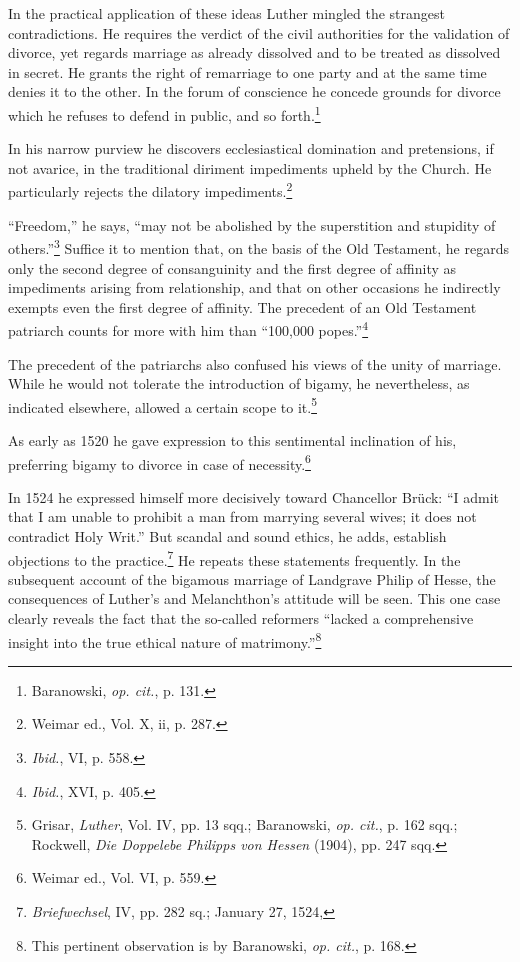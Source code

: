 In the practical application of these ideas Luther mingled the
strangest contradictions. He requires the verdict of the civil authorities
for the validation of divorce, yet regards marriage as already dissolved
and to be treated as dissolved in secret. He grants the right of
remarriage to one party and at the same time denies it to the other.
In the forum of conscience he concede grounds for divorce which he
refuses to defend in public, and so forth.\footnote{Baranowski, \textit{op. cit.}, p. 131.}

In his narrow purview he discovers ecclesiastical domination and
pretensions, if not avarice, in the traditional diriment impediments
upheld by the Church. He particularly rejects the dilatory impediments.\footnote{Weimar ed., Vol. X, ii, p. 287.}

“Freedom,” he says, “may not be abolished by
the superstition and stupidity of others.”\footnote{\textit{Ibid.}, VI, p. 558.}
 Suffice it to mention that,
on the basis of the Old Testament, he regards only the second degree
of consanguinity and the first degree of affinity as impediments arising
from relationship, and that on other occasions he indirectly exempts even
the first degree of affinity. The precedent of an Old Testament patriarch
counts for more with him than “100,000 popes.”\footnote{\textit{Ibid.}, XVI, p. 405.}

The precedent of the patriarchs also confused his views of the
unity of marriage. While he would not tolerate the introduction of
bigamy, he nevertheless, as indicated elsewhere, allowed a certain scope
to it.\footnote
{Grisar, \textit{Luther}, Vol. IV, pp. 13 sqq.; Baranowski, \textit{op. cit.}, p. 162 sqq.; Rockwell, \textit{Die
Doppelebe Philipps von Hessen} (1904), pp. 247 sqq.}

As early as 1520 he gave expression to this sentimental inclination
of his, preferring bigamy to divorce in case of necessity.\footnote{Weimar ed., Vol. VI, p. 559.}

In 1524 he expressed himself more decisively toward Chancellor
Brück: “I admit that I am unable to prohibit a man from marrying
several wives; it does not contradict Holy Writ.” But scandal and
sound ethics, he adds, establish objections to the practice.\footnote{\textit{Briefwechsel}, IV, pp. 282 sq.; January 27, 1524,}
 He
repeats these statements frequently. In the subsequent account of the
bigamous marriage of Landgrave Philip of Hesse, the consequences
of Luther’s and Melanchthon’s attitude will be seen. This one case
clearly reveals the fact that the so-called reformers “lacked a comprehensive
insight into the true ethical nature of matrimony.”\footnote{This pertinent observation is by Baranowski, \textit{op. cit.}, p. 168.}

